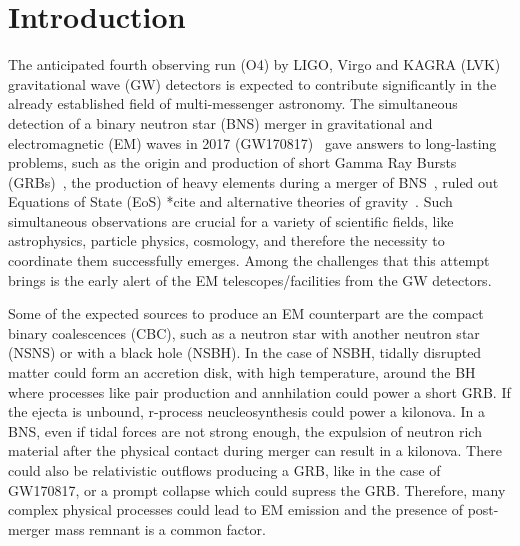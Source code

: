 \section{Introduction}

The anticipated fourth observing run (O4) by LIGO, Virgo and KAGRA (LVK)
gravitational wave (GW) detectors is expected to contribute significantly in
the already established field of multi-messenger astronomy. The simultaneous
detection of a binary neutron star (BNS) merger in gravitational and
electromagnetic (EM) waves in 2017 (GW170817)~\cite{LIGOScientific:2017ync}
gave answers to long-lasting problems, such as the origin and production of
short Gamma Ray Bursts (GRBs)~\cite{LIGOScientific:2017ync}, the production of heavy 
elements during a merger of 
BNS~\cite{Arcavi:2017xiz,Chornock:2017sdf,2017Sci...358.1570D,2017Natur.551...80K}, 
ruled out Equations of State (EoS) *cite and alternative theories of 
gravity~\cite{PhysRevLett.119.251301}. Such simultaneous observations are 
crucial for a variety of scientific fields, like astrophysics, particle 
physics, cosmology, and therefore the necessity to coordinate them successfully 
emerges. Among the challenges that this attempt brings is the early alert of the 
EM telescopes/facilities from the GW detectors.

Some of the expected sources to produce an EM counterpart are the compact 
binary coalescences (CBC), such as a neutron star with another neutron star 
(NSNS) or with a black hole (NSBH). In the case of NSBH, tidally disrupted 
matter could form an accretion disk, with high temperature, around the BH 
where processes like pair production and annhilation could power a short GRB. 
If the ejecta is unbound, r-process neucleosynthesis could power a kilonova. 
In a BNS, even if tidal forces are not strong enough, the expulsion of neutron 
rich material after the physical contact during merger can result in a kilonova. 
There could also be relativistic outflows producing a GRB, like in the case of 
GW170817, or a prompt collapse which could supress the GRB. Therefore, many 
complex physical processes could lead to EM emission and the presence of 
post-merger mass remnant is a common factor.

